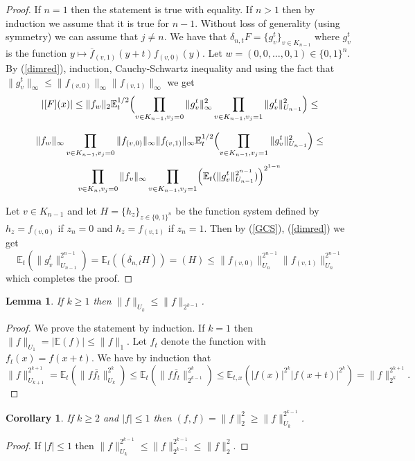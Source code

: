 \documentclass [11pt] {article}
\newtheorem{lemma}{Lemma}[section]
\newtheorem{corollary}{Corollary}[section]
\begin{document}
\begin{proof} If $n=1$ then the statement is true with equality. If $n>1$ then by induction we assume that it is true for $n-1$. Without loss of generality (using symmetry) we can assume that $j\neq n$. 
We have that $\delta_{n,t} F=\{g_v^t\}_{v\in K_{n-1}}$ where $g_v^t$ is the function $y\mapsto\overline{f}_{(v,1)}(y+t)f_{(v,0)}(y)$. Let $w=(0,0,\dots,0,1)\in\{0,1\}^n$.
By (\ref{dimred}), induction, Cauchy-Schwartz inequality and using the fact that $\|g_v^t\|_\infty\leq\|f_{(v,0)}\|_\infty\|f_{(v,1)}\|_\infty$ we get
$$|[F](x)|\leq\|f_w\|_2\mathbb{E}_t^{1/2}\Bigl(\prod_{v\in K_{n-1},v_j=0}\|g_v^t\|^2_\infty\prod_{v\in K_{n-1},v_j=1}\|g_v^t\|^2_{U_{n-1}}\Bigr)\leq$$

$$\|f_w\|_\infty\prod_{v\in K_{n-1},v_j=0}\|f_{(v,0)}\|_\infty\|f_{(v,1)}\|_\infty\mathbb{E}_t^{1/2}\Bigl(\prod_{v\in K_{n-1},v_j=1}\|g_v^t\|^2_{U_{n-1}}\Bigr)\leq$$
$$\prod_{v\in K_n,v_j=0}\|f_v\|_\infty\prod_{v\in K_{n-1},v_j=1}\Bigl(\mathbb{E}_t(\|g_v^t\|_{U_{n-1}}^{2^{n-1}})\Bigr)^{2^{1-n}}$$

Let $v\in K_{n-1}$ and let $H=\{h_z\}_{z\in \{0,1\}^n}$ be the function system defined by $h_z=f_{(v,0)}$ if $z_n=0$ and $h_z=f_{(v,1)}$ if $z_n=1$. Then by (\ref{GCS}), (\ref{dimred}) we get
$$\mathbb{E}_t(\|g_v^t\|_{U_{n-1}}^{2^{n-1}})=\mathbb{E}_t((\delta_{n,t}H))=(H)\leq\|f_{(v,0)}\|_{U_n}^{2^{n-1}}\|f_{(v,1)}\|_{U_n}^{2^{n-1}}$$
which completes the proof.
\end{proof}

\medskip

\begin{lemma} If $k\geq 1$ then $\|f\|_{U_k}\leq\|f\|_{2^{k-1}}$.
\end{lemma}

\begin{proof} We prove the statement by induction. If $k=1$ then $\|f\|_{U_1}=|\mathbb{E}(f)|\leq\|f\|_1$.
Let $f_t$ denote the function with $f_t(x)=f(x+t)$. We have by induction that
$$\|f\|_{U_{k+1}}^{2^{k+1}}=\mathbb{E}_{t}(\|f\overline{f_t}\|_{U_k}^{2^k})\leq\mathbb{E}_t(\|f\overline{f_t}\|_{2^{k-1}}^{2^k})\leq\mathbb{E}_{t,x}(|f(x)|^{2^k}|f(x+t)|^{2^k})=\|f\|_{2^k}^{2^{k+1}}.$$
\end{proof}

\begin{corollary}\label{l2becs} If $k\geq 2$ and $|f|\leq 1$ then $(f,f)=\|f\|_2^2\geq \|f\|_{U_k}^{2^{k-1}}$.
\end{corollary}

\begin{proof} If $|f|\leq 1$ then $\|f\|_{U_k}^{2^{k-1}}\leq\|f\|_{2^{k-1}}^{2^{k-1}}\leq\|f\|_2^2$.
\end{proof}
\end{document}

